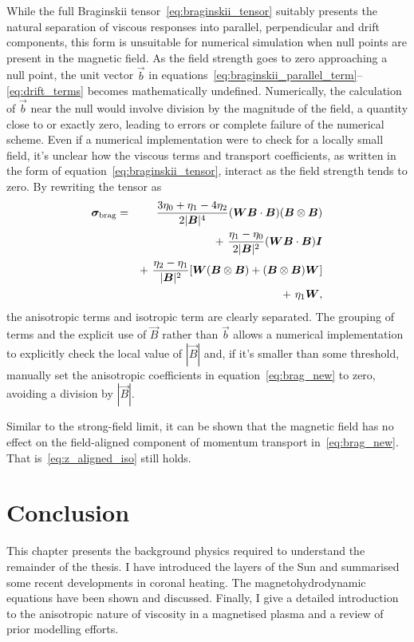 While the full Braginskii tensor~\ref{eq:braginskii_tensor} suitably presents the natural separation of viscous responses into parallel, perpendicular and drift components, this form is unsuitable for numerical simulation when null points are present in the magnetic field. As the field strength goes to zero approaching a null point, the unit vector $\vec{b}$ in equations~\ref{eq:braginskii_parallel_term}--\ref{eq:drift_terms} becomes mathematically undefined. Numerically, the calculation of $\vec{b}$ near the null would involve division by the magnitude of the field, a quantity close to or exactly zero, leading to errors or complete failure of the numerical scheme. Even if a numerical implementation were to check for a locally small field, it's unclear how the viscous terms and transport coefficients, as written in the form of equation~\ref{eq:braginskii_tensor}, interact as the field strength tends to zero. By rewriting the tensor as
\begin{eqnarray}\label{eq:brag_new}
\ten{\sigma}_{\rm brag} = &&\frac{3\eta_0+\eta_1-4\eta_2}{2|\vec{B}|^4}(\ten{W}\vec{B}\cdot\vec{B})(\vec{B}\otimes\vec{B})\\%
\nonumber
& &+~ \frac{\eta_1-\eta_0}{2|\vec{B}|^2}(\ten{W}\vec{B}\cdot\vec{B})\ten{I}\\%
\nonumber
& &+~ \frac{\eta_2-\eta_1}{|\vec{B}|^2}[\ten{W}(\vec{B}\otimes\vec{B})+(\vec{B}\otimes\vec{B})\ten{W}] \\%
\nonumber
& &+~ \eta_1\ten{W},%
\end{eqnarray}
the anisotropic terms and isotropic term are clearly separated. The grouping of terms and the explicit use of $\vec{B}$ rather than $\vec{b}$ allows a numerical implementation to explicitly check the local value of $|\vec{B}|$ and, if it's smaller than some threshold, manually set the anisotropic coefficients in equation~\ref{eq:brag_new} to zero, avoiding a division by $|\vec{B}|$.

Similar to the strong-field limit, it can be shown that the magnetic field has no effect on the field-aligned component of momentum transport in~\ref{eq:brag_new}. That is~\ref{eq:z_aligned_iso} still holds.

\section{Conclusion}

This chapter presents the background physics required to understand the remainder of the thesis. I have introduced the layers of the Sun and summarised some recent developments in coronal heating. The magnetohydrodynamic equations have been shown and discussed. Finally, I give a detailed introduction to the anisotropic nature of viscosity in a magnetised plasma and a review of prior modelling efforts.
